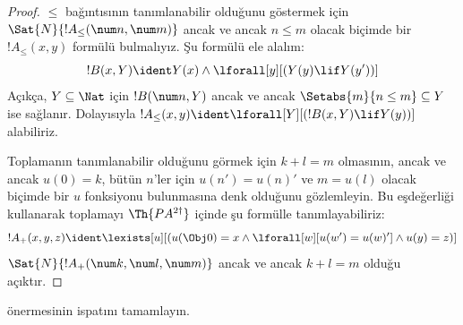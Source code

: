 \documentclass[../../../include/open-logic-section]{subfiles}
\begin{document}
\begin{proof}
$\le$ bağıntısının tanımlanabilir olduğunu göstermek için
$\Sat{N}{!A_\le(\num n, \num m)}$ ancak ve ancak $n\le m$ olacak biçimde bir
$!A_\le(x,y)$ formülü bulmalıyız. Şu formülü ele alalım:
\[
!B(x, Y) \ident Y(x) \land \lforall[y][(Y(y) \lif Y(y'))]
\]
Açıkça, $Y\subseteq\Nat$ için $!B(\num n,Y)$ ancak ve ancak
$\Setabs{m}{n\le m}\subseteq Y$ ise sağlanır. Dolayısıyla
$!A_\le(x,y)\ident\lforall[Y][(!B(x,Y)\lif Y(y))]$ alabiliriz.

Toplamanın tanımlanabilir olduğunu görmek için $k+l=m$ olmasının, ancak ve
ancak $u(0)=k$, bütün $n$'ler için $u(n')=u(n)'$ ve $m=u(l)$ olacak biçimde
bir $u$ fonksiyonu bulunmasına denk olduğunu gözlemleyin. Bu eşdeğerliği
kullanarak toplamayı $\Th{PA^{2\dagger}}$ içinde şu formülle tanımlayabiliriz:
\[
!A_+(x,y,z) \ident \lexists[u][(u(\Obj 0)=x \land \lforall[w][u(w')=u
 (w)'] \land u(y)=z)]
\]
$\Sat{N}{!A_+(\num k,\num l,\num m)}$ ancak ve ancak $k+l=m$ olduğu açıktır.
\end{proof}

\begin{prob}
 önermesinin ispatını tamamlayın.
\end{prob}
\end{document}
